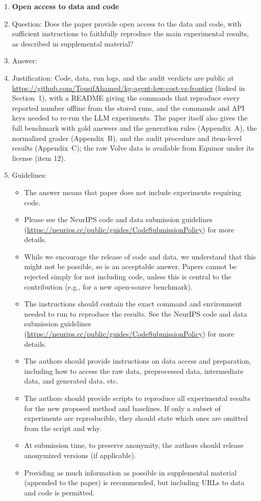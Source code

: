 \begin{enumerate}
\item {\bf Open access to data and code}
    \item[] Question: Does the paper provide open access to the data and code, with sufficient instructions to faithfully reproduce the main experimental results, as described in supplemental material?
    \item[] Answer: \answerYes{}
    \item[] Justification: Code, data, run logs, and the audit verdicts are public at \url{https://github.com/TousifAhamed/kg-agent-low-cost-vs-frontier} (linked in Section~1), with a README giving the commands that reproduce every reported number offline from the stored runs, and the commands and API keys needed to re-run the LLM experiments. The paper itself also gives the full benchmark with gold answers and the generation rules (Appendix~A), the normalized grader (Appendix~B), and the audit procedure and item-level results (Appendix~C); the raw Volve data is available from Equinor under its license (item 12).
    \item[] Guidelines:
    \begin{itemize}
        \item The answer \answerNA{} means that paper does not include experiments requiring code.
        \item Please see the NeurIPS code and data submission guidelines (\url{https://neurips.cc/public/guides/CodeSubmissionPolicy}) for more details.
        \item While we encourage the release of code and data, we understand that this might not be possible, so \answerNo{} is an acceptable answer. Papers cannot be rejected simply for not including code, unless this is central to the contribution (e.g., for a new open-source benchmark).
        \item The instructions should contain the exact command and environment needed to run to reproduce the results. See the NeurIPS code and data submission guidelines (\url{https://neurips.cc/public/guides/CodeSubmissionPolicy}) for more details.
        \item The authors should provide instructions on data access and preparation, including how to access the raw data, preprocessed data, intermediate data, and generated data, etc.
        \item The authors should provide scripts to reproduce all experimental results for the new proposed method and baselines. If only a subset of experiments are reproducible, they should state which ones are omitted from the script and why.
        \item At submission time, to preserve anonymity, the authors should release anonymized versions (if applicable).
        \item Providing as much information as possible in supplemental material (appended to the paper) is recommended, but including URLs to data and code is permitted.
    \end{itemize}



\end{enumerate}
